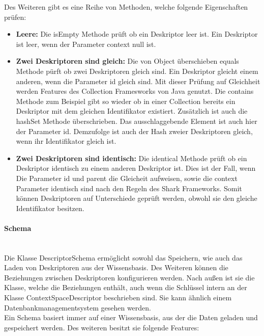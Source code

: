 \documentclass[a4paper]{article}
\begin{document}
	Des Weiteren gibt es eine Reihe von Methoden, welche folgende Eigenschaften
	prüfen:
	
	\begin{itemize}
		\item \textbf{Leere:} Die isEmpty Methode prüft ob ein Deskriptor
		leer ist. Ein Deskriptor ist leer, wenn der Parameter context null ist.
		\item \textbf{Zwei Deskriptoren sind gleich:} Die von Object überschieben
		equals Methode pürft ob zwei Deskriptoren gleich sind. Ein Deskriptor
		gleicht einem anderen, wenn die Parameter id gleich sind. Mit dieser
		Prüfung	auf Gleichheit werden Features des Collection Framesworks 
		von Java genutzt. Die contains Methode zum Beispiel gibt so wieder ob
		in einer Collection bereits ein Deskriptor mit dem gleichen Identifikator
		existiert. Zusätzlich ist auch die hashSet Methode überschrieben. Das
		ausschlaggebende Element ist auch hier der Parameter id. Demzufolge
		ist auch der Hash zweier Deskriptoren gleich, wenn ihr Identifikator 
		gleich ist.
		\item \textbf{Zwei Deskriptoren sind identisch:} Die identical Methode
		prüft ob ein Deskriptor identisch zu einem anderen Deskriptor ist. Dies
		ist der Fall, wenn Die Parameter id und parent die Gleicheit aufweisen,
		sowie die context Parameter identisch sind nach den Regeln des Shark
		Frameworks. Somit können Deskriptoren auf Unterschiede geprüft werden,
		obwohl sie den gleiche Identifikator besitzen.
	\end{itemize}
	
	\paragraph{Schema}\mbox{} \\
	
	Die Klasse DescriptorSchema ermöglicht sowohl das Speichern, wie auch das
	Laden von Deskriptoren aus der Wissensbasis. Des Weiteren können die
	Beziehungen	zwischen Deskriptoren konfigurieren werden.
	Nach außen ist sie die Klasse, welche die Beziehungen enthält, auch wenn die
	Schlüssel intern an der Klasse ContextSpaceDescriptor beschrieben sind. Sie kann
	ähnlich einem Datenbankmanagementsystem gesehen werden. \\
	
	Ein Schema basiert immer auf einer Wissensbasis, aus der die Daten geladen und
	gespeichert werden. Des weiteren besitzt sie folgende Features:
	
\end{document}
